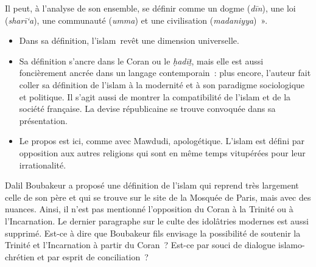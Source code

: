 Il peut, à l'analyse de son ensemble, se définir comme un dogme
(\emph{dīn}), une loi (\emph{sharī`a}), une communauté (\emph{umma}) et
une civilisation (\emph{madaniyya})~».

\begin{itemize}
\item
  Dans sa définition, l'islam~revêt une dimension universelle.
\item
  Sa définition s'ancre dans le Coran ou le \emph{ḥadīṯ}, mais elle est
  aussi foncièrement ancrée dans un langage contemporain~: plus encore,
  l'auteur fait coller sa définition de l'islam à la modernité et à son
  paradigme sociologique et politique. Il s'agit aussi de montrer la
  compatibilité de l'islam et de la société française. La devise
  républicaine se trouve convoquée dans sa présentation.
\item
  Le propos est ici, comme avec Mawdudi, apologétique. L'islam est
  défini par opposition aux autres religions qui sont en même temps
  vitupérées pour leur irrationalité.
\end{itemize}

Dalil Boubakeur a proposé une définition de l'islam qui reprend très
largement celle de son père et qui se trouve sur le site de la Mosquée
de Paris, mais avec des nuances. Ainsi, il n'est pas mentionné l'opposition du Coran à
la Trinité ou à l'Incarnation. Le dernier paragraphe sur le culte des
idolâtries modernes est aussi supprimé. Est-ce à dire que Boubakeur fils
envisage la possibilité de soutenir la Trinité et l'Incarnation à partir
du Coran~? Est-ce par souci de dialogue islamo-chrétien et par esprit de
conciliation~?


